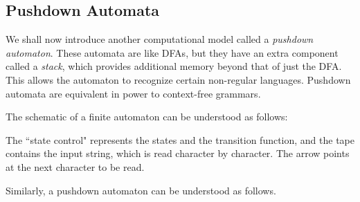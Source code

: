 \subsection{Pushdown Automata}
We shall now introduce another computational model called a \textit{pushdown automaton}. These automata are like DFAs, but they have an extra component called a \textit{stack}, which provides additional memory beyond that of just the DFA. This allows the automaton to recognize certain non-regular languages. Pushdown automata are equivalent in power to context-free grammars. 

The schematic of a finite automaton can be understood as follows:
\begin{center}
\end{center}

The ``state control" represents the states and the transition function, and the tape contains the input string, which is read character by character. The arrow points at the next character to be read.

\vspace{3mm}
Similarly, a pushdown automaton can be understood as follows.

